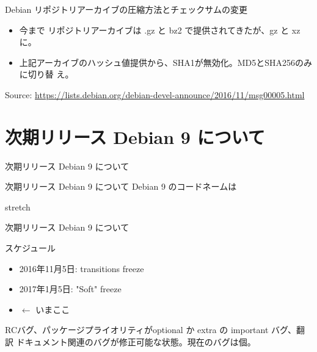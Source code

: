 \begin{frame}{Debian リポジトリアーカイブの圧縮方法とチェックサムの変更}

\begin{itemize}
\item 今まで リポジトリアーカイブは .gz と bz2 で提供されてきたが、gz と xz に。
\item 上記アーカイブのハッシュ値提供から、SHA1が無効化。MD5とSHA256のみに切り替
え。
\end{itemize}

Source: \url{https://lists.debian.org/debian-devel-announce/2016/11/msg00005.html}

\end{frame}




\section{次期リリース Debian 9 について}
\begin{frame}\begin{center}\Huge{次期リリース Debian 9 について}\end{center}\end{frame}

\begin{frame}{次期リリース Debian 9 について}%
Debian 9 のコードネームは \pause \\
 \begin{center}
{\Huge stretch} \pause
 \end{center}
\end{frame}

\begin{frame}{次期リリース Debian 9 について}%

スケジュール

\begin{itemize}
\item 2016年11月5日: transitions freeze
\item 2017年1月5日: "Soft" freeze
\item \color{red}{2017年2月5日: Full freeze} $\leftarrow$ いまここ
\end{itemize}

RCバグ、パッケージプライオリティがoptional か extra の important バグ、翻訳
ドキュメント関連のバグが修正可能な状態。現在のバグは\color{red}{153}個。


\end{frame}

